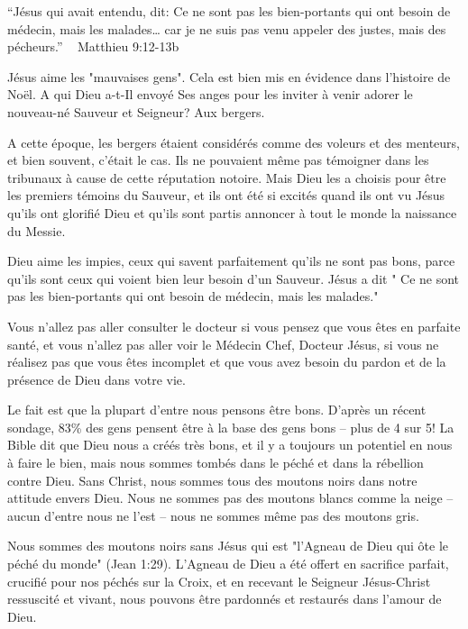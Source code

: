

“Jésus qui avait entendu, dit: Ce ne sont pas les bien-portants qui ont besoin de médecin, mais les malades… car je ne suis pas venu appeler des justes, mais des pécheurs.”
                                                 ~ Matthieu 9:12-13b

Jésus aime les "mauvaises gens". Cela est bien mis en évidence dans l'histoire de Noël. A qui Dieu a-t-Il envoyé Ses anges pour les inviter à venir adorer le nouveau-né Sauveur et Seigneur? Aux bergers.

A cette époque, les bergers étaient considérés comme des voleurs et des menteurs, et bien souvent, c'était le cas. Ils ne pouvaient même pas témoigner dans les tribunaux à cause de cette réputation notoire. Mais Dieu les a choisis pour être les premiers témoins du Sauveur, et ils ont été si excités quand ils ont vu Jésus qu'ils ont glorifié Dieu et qu'ils sont partis annoncer à tout le monde la naissance du Messie.

Dieu aime les impies, ceux qui savent parfaitement qu'ils ne sont pas bons, parce qu'ils sont ceux qui voient bien leur besoin d'un Sauveur. Jésus a dit " Ce ne sont pas les bien-portants qui ont besoin de médecin, mais les malades."

Vous n'allez pas aller consulter le docteur si vous pensez que vous êtes en parfaite santé, et vous n'allez pas aller voir le Médecin Chef, Docteur Jésus, si vous ne réalisez pas que vous êtes incomplet et que vous avez besoin du pardon et de la présence de Dieu dans votre vie.

Le fait est que la plupart d'entre nous pensons être bons. D'après un récent sondage, 83\% des gens pensent être à la base des gens bons – plus de 4 sur 5! La Bible dit que Dieu nous a créés très bons, et il y a toujours un potentiel en nous à faire le bien, mais nous sommes tombés dans le péché et dans la rébellion contre Dieu. Sans Christ, nous sommes tous des moutons noirs dans notre attitude envers Dieu. Nous ne sommes pas des moutons blancs comme la neige – aucun d'entre nous ne l'est – nous ne sommes même pas des moutons gris.

Nous sommes des moutons noirs sans Jésus qui est "l'Agneau de Dieu qui ôte le péché du monde" (Jean 1:29). L'Agneau de Dieu a été offert en sacrifice parfait, crucifié pour nos péchés sur la Croix, et en recevant le Seigneur Jésus-Christ ressuscité et vivant, nous pouvons être pardonnés et restaurés dans l'amour de Dieu.

